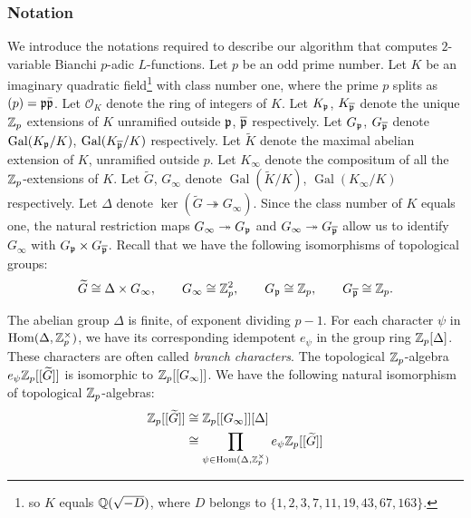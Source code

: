 \documentclass[a4paper,11pt]{article}
\newcommand{\cO}{\mathcal{O}}
\DeclareMathOperator{\Gal}{Gal}
\numberwithin{equation}{section}
\newcommand{\Galois}[2]{\Gal({#1}/{#2})}
\begin{document}
\subsubsection*{Notation} We introduce the notations required to describe our algorithm that computes $2$-variable Bianchi $p$-adic $L$-functions. Let $p$ be an odd prime number. Let $K$ be an imaginary quadratic field\footnote{so $K$ equals $\mathbb{Q}(\sqrt{-D})$, where $D$ belongs to $\{1,2,3,7,11,19,43,67,163\}$.} with class number one, where the prime $p$ splits as $(p) = \mathfrak{p} \bar{\mathfrak{p}}$. Let $\cO_K$ denote the ring of integers of $K$. Let $K_{\mathfrak{p}}$, $K_{\overline{\mathfrak{p}}}$ denote the unique $\mathbb{Z}_p$ extensions of $K$ unramified outside $\mathfrak{p}$, $\overline{\mathfrak{p}}$ respectively. Let $G_{\mathfrak{p}}$, $G_{\overline{\mathfrak{p}}}$ denote $\Galois{K_\pri}{K}$, $\Galois{K_{\overline{\pri}}}{K}$ respectively. Let $\widetilde{K}$ denote the maximal abelian extension of $K$, unramified outside $p$. Let $K_\infty$ denote the compositum of all the $\mathbb{Z}_p$-extensions of $K$. Let $\widetilde{G}$, $G_\infty$ denote $\Galois{\widetilde{K}}{K}$, $\Galois{K_\infty}{K}$ respectively. Let $\Delta$ denote $\ker(\widetilde{G} \twoheadrightarrow G_\infty)$. Since the class number of $K$ equals one, the natural restriction maps $G_\infty \twoheadrightarrow G_{\mathfrak{p}}$ and $G_\infty \twoheadrightarrow G_{\overline{\mathfrak{p}}}$ allow us to identify $G_\infty$ with  $G_{\mathfrak{p}} \times G_{\overline{\mathfrak{p}}}$. Recall that we have the following isomorphisms of topological groups:
\begin{align*}
\widetilde{G} \cong \Delta \times G_\infty, \qquad G_\infty \cong \mathbb{Z}_p^2, \qquad G_{\mathfrak{p}} \cong \mathbb{Z}_p, \qquad G_{\overline{\mathfrak{p}}} \cong \mathbb{Z}_p.
\end{align*}

The abelian group $\Delta$ is finite, of exponent dividing $p-1$. For each character $\psi$ in $\mathrm{Hom}(\Delta, \mathbb{Z}_p^\times)$, we have its corresponding idempotent $e_\psi$ in the group ring $\mathbb{Z}_p[\Delta]$. These characters are often called \textit{branch characters}.  The topological $\mathbb{Z}_p$-algebra $e_\psi \mathbb{Z}_p[[\widetilde{G}]]$ is isomorphic to $\mathbb{Z}_p[[G_\infty]]$. We have the following natural isomorphism of topological $\mathbb{Z}_p$-algebras:
\begin{align}\label{eq:ringdecomp}
\mathbb{Z}_p[[\widetilde{G}]] &\cong \mathbb{Z}_p[[G_\infty]][\Delta] \notag \\ & \cong \prod_{\psi \in \mathrm{Hom}(\Delta, \mathbb{Z}_p^\times)} e_\psi\mathbb{Z}_p[[\widetilde{G}]]
\end{align}
\end{document}
